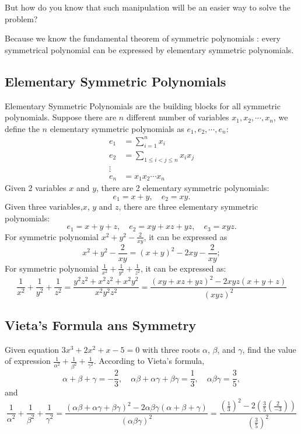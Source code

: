 \documentclass[11pt, oneside]{article}   	%
\begin{document}
But how do you know that such manipulation will be an easier way to solve the problem?

Because we know the fundamental theorem of symmetric polynomials : every symmetrical polynomial can be expressed by elementary symmetric polynomials. 
 
 \subsection{Elementary Symmetric Polynomials}
 Elementary Symmetric Polynomials are the building blocks for all symmetric polynomials. Suppose there are $n$ different number of variables $x_1, x_2, \cdots, x_n$, we define the $n$ elementary symmetric polynomials as $e_1, e_2, \cdots, e_n$:
 \begin{align*}
 e_1&= \sum_{i=1}^{n} x_i \\
 e_2&=\sum_{1\le i<j\le n}x_i x_j\\
 \vdots\\
 e_n&=x_1 x_2  \cdots x_n
 \end{align*}
 Given 2 variables $x$ and $y$, there are 2 elementary symmetric polynomials: 
 \[e_1=x+y, \quad e_2=xy.\]
 Given three variables,$x$, $y$ and $z$, there are three elementary symmetric polynomials:
  \[e_1=x+y+z, \quad e_2=xy+xz+yz, \quad e_3=xyz.\]
  For symmetric polynomial $x^2+y^2-\frac{2}{xy}$, it can be expressed as 
  \[x^2+y^2-\frac{2}{xy} = (x+y)^2-2xy-\frac{2}{xy} ; \]
  For symmetric polynomial $\frac{1}{x^2} + \frac{1}{y^2} + \frac{1}{z^2}$, it can be expressed as:
  \[\frac{1}{x^2} + \frac{1}{y^2} + \frac{1}{z^2}=\frac{y^2 z^2+x^2 z^2+x^2 y^2}{x^2 y^2 z^2}=\frac{(xy+xz+yz)^2-2xyz(x+y+z)}{(xyz)^2}\]
  
  \subsection{Vieta's Formula ans Symmetry}
  Given equation $3x^3+2x^2+x-5=0$ with three roots $\alpha$, $\beta$, and $\gamma$, find the value of expression $\frac{1}{\alpha^2}+\frac{1}{\beta^2}+\frac{1}{\gamma^2}$. According to Vieta's formula, 
  \[\alpha+\beta+\gamma= - \frac{2}{3}, \quad \alpha\beta + \alpha\gamma +\beta\gamma= \frac{1}{3}, \quad \alpha\beta\gamma = \frac{3}{5},\] and
  \[\frac{1}{\alpha^2}+\frac{1}{\beta^2}+\frac{1}{\gamma^2}=\frac{(\alpha\beta+\alpha\gamma+\beta\gamma)^2-2\alpha\beta\gamma(\alpha+\beta+\gamma)}{(\alpha\beta\gamma)^2}=\frac{(\frac{1}{3})^2-2(\frac{3}{5}(\frac{2}{-3}))}{(\frac{3}{5})^2}\]
  
\end{document}
